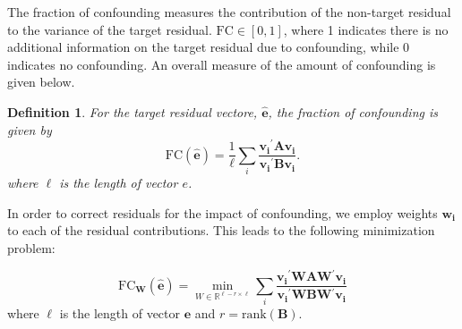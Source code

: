 \documentclass[11pt]{article} %
\newtheorem{definition}{Definition}
\newcommand{\trans}{\ensuremath{^\prime}}
\newcommand{\var}{\ensuremath{\mathrm{Var}}}
\begin{document}


The fraction of confounding measures the contribution of the non-target residual to the variance of the target residual. $\text{FC} \in [0,1]$, where 1 indicates there is no additional information on the target residual due to confounding, while 0 indicates no confounding. An overall measure of the amount of confounding is given below.\\

\begin{definition}
For the target residual vectore, $\widehat{\bm{e}}$, the fraction of confounding is given by
%
\begin{equation}\label{eq:fc2}
\text{FC}(\widehat{\bm{e}}) = 
\dfrac{1}{\ell} \displaystyle{\sum_i} \frac{\bm{v_i}\trans \bm{A} \bm{v_i}}
		{\bm{v_i}\trans \bm{B} \bm{v_i}}.
\end{equation}
where $\ell$ is the length of vector $e$.

\end{definition}


In order to correct residuals for the impact of confounding, we employ weights $\bm{w_i}$ to each of the residual contributions. This leads to the following minimization problem:

\begin{equation}\label{eq:minimize}
\text{FC}_{\bm{W}}(\widehat{\bm{e}}) = \min_{W \in \mathbb{R}^{\ell-r \times \ell} } 
\displaystyle{\sum_i} \frac{\bm{v_i}\trans \bm{W} \bm{A} \bm{W}\trans \bm{v_i}}
		{\bm{v_i}\trans \bm{W} \bm{B} \bm{W}\trans \bm{v_i}}
\end{equation}
where $\ell$ is the length of vector $\bm{e}$ and $r = \text{rank}(\bm{B})$.\\
\end{document}
